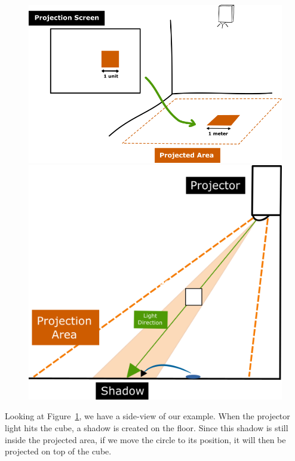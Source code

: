 \begin{figure}[!t]
  \centering
  \includegraphics[width=\linewidth]{imgs/impl/projection3}
    \caption{}
    \label{fig:projection3}
    \endminipage\hfill
{}
  \centering
  \includegraphics[width=\linewidth]{imgs/impl/projection5}
    \caption{}
    \label{fig:projection5}
    \endminipage
\end{figure}

Looking at Figure~\ref{fig:projection5}, we have a side-view of our example. When the projector light hits the cube, a shadow is created on the floor. 
Since this shadow is still inside the projected area, if we move the circle to its position, it will then be projected on top of the cube.

